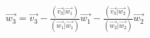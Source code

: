 \documentclass[preview]{standalone}
\begin{document}
\begin{center}
$\vec{w_3} = \vec{v_3} - \frac{(\vec{v_3} | \vec{w_1})}{(\vec{w_1} | \vec{w_1})} \vec{w_1} - \frac{(\vec{v_3} | \vec{w_2})}{(\vec{w_2} | \vec{w_2})} \vec{w_2} $\newline
\end{center}
\end{document}
